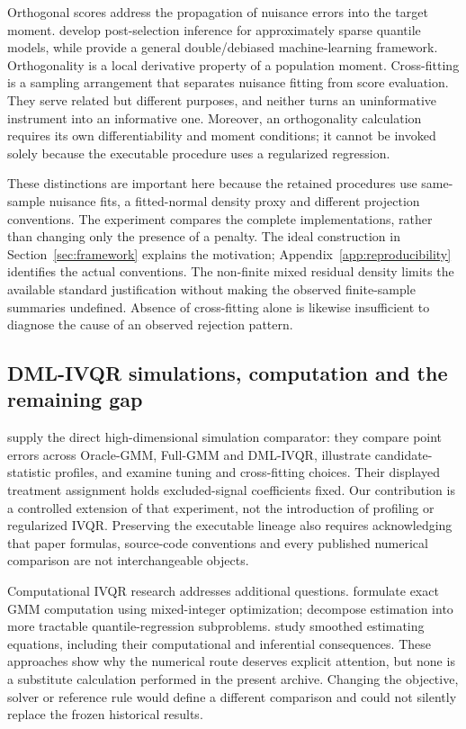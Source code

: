 Orthogonal scores address the propagation of nuisance errors into the target moment. \textcite{belloni_chernozhukov_kato_2019} develop post-selection inference for approximately sparse quantile models, while \textcite{chernozhukov_et_al_2018} provide a general double/debiased machine-learning framework. Orthogonality is a local derivative property of a population moment. Cross-fitting is a sampling arrangement that separates nuisance fitting from score evaluation. They serve related but different purposes, and neither turns an uninformative instrument into an informative one. Moreover, an orthogonality calculation requires its own differentiability and moment conditions; it cannot be invoked solely because the executable procedure uses a regularized regression.

These distinctions are important here because the retained procedures use same-sample nuisance fits, a fitted-normal density proxy and different projection conventions. The experiment compares the complete implementations, rather than changing only the presence of a penalty. The ideal construction in Section~\ref{sec:framework} explains the motivation; Appendix~\ref{app:reproducibility} identifies the actual conventions. The non-finite mixed residual density limits the available standard justification without making the observed finite-sample summaries undefined. Absence of cross-fitting alone is likewise insufficient to diagnose the cause of an observed rejection pattern.

\subsection{DML-IVQR simulations, computation and the remaining gap}
\textcite{chen_huang_tien_2021} supply the direct high-dimensional simulation comparator: they compare point errors across Oracle-GMM, Full-GMM and DML-IVQR, illustrate candidate-statistic profiles, and examine tuning and cross-fitting choices. Their displayed treatment assignment holds excluded-signal coefficients fixed. Our contribution is a controlled extension of that experiment, not the introduction of profiling or regularized IVQR. Preserving the executable lineage also requires acknowledging that paper formulas, source-code conventions and every published numerical comparison are not interchangeable objects.

Computational IVQR research addresses additional questions. \textcite{chen_lee_2018} formulate exact GMM computation using mixed-integer optimization; \textcite{kaido_wuthrich_2021} decompose estimation into more tractable quantile-regression subproblems. \textcite{kaplan_sun_2017} study smoothed estimating equations, including their computational and inferential consequences. These approaches show why the numerical route deserves explicit attention, but none is a substitute calculation performed in the present archive. Changing the objective, solver or reference rule would define a different comparison and could not silently replace the frozen historical results.

